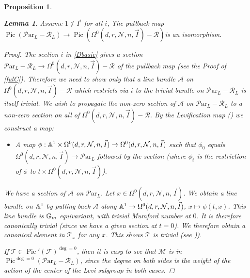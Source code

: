 \documentclass[11pt]{amsart}
\newcommand\mf{\mathcal{F}}
\newcommand\Pic{\operatorname{Pic}}
\newcommand\ma{\mathcal{A}}
\newcommand\mn{\mathcal{N}}
\newcommand\ParL{\mathcal{P}\text{ar}_L}
\newcommand\Par{\mathcal{P}\text{ar} }
\newtheorem{proposition}[theorem]{Proposition}
\newtheorem{lemma}[theorem]{Lemma}
\numberwithin{theorem}{subsection}
\begin{document}
{\begin{proposition}
\begin{lemma}\label{muchlater}
Assume $1\not\in I^i$ for all $i$,
The pullback map
$\Pic(\Par_L-\mathcal{R}_L)\to  \Pic({\Omega}^0(d,r,\mn,n,\vec{I})-\mathcal{R})$is an isomorphism.
\end{lemma}
\begin{proof}
The section $i$ in \eqref{Dbasic} gives a section $\ParL-\mathcal{R}_L\to {\Omega}^0(d,r,\mn,n,\vec{I})-\mathcal{R}$ of the pullback map (see the Proof of \eqref{fulC}). Therefore we need to show only that a line bundle $\ma$ on ${\Omega}^0(d,r,\mn,n,\vec{I})-\mathcal{R}$ which restricts via $i$ to the trivial bundle
on $\ParL-\mathcal{R}_L$ is itself trivial. We wish to propagate the non-zero section of $\ma$ on  $\ParL-\mathcal{R}_L$ to a non-zero section on all of ${\Omega}^0(d,r,\mn,n,\vec{I})-\mathcal{R}$.
By  the Levification map (\cite[Section 3.8]{BKq}) we construct a map:
\begin{itemize}
\item[-] A map $\phi:\Bbb{A}^1\times {\Omega}^0(d,r,\mn,n,\vec{I})\to \Omega^0(d,r,\mn,n,\vec{I})$ such that $\phi_0$ equals $\Omega^0(d,r,\mn,n,\vec{I})\to \ParL$ followed by the section (where $\phi_t$ is the restriction of $\phi$ to $t\times \Omega^0(d,r,\mn,n,\vec{I})$).
\end{itemize}

We have a section of $\mathcal{A}$ on $\ParL$. Let $x\in \Omega^0(d,r,\mn,n,\vec{I})$. We obtain a line bundle on $\Bbb{A}^1$ by pulling back  $\mathcal{A}$ along $\Bbb{A}^1\to \Omega^0(d,r,\mn,n,\vec{I})$, $x\mapsto \phi(t,x)$. This line bundle is $\Bbb{G}_m$ equivariant, with trivial Mumford number at $0$. It is therefore canonically trivial (since we have a given section at $t=0$). We therefore obtain a canonical element in $\mathcal{T}_x$ for any $x$. This shows $\mathcal{T}$ is trivial (see \cite[Lemma 8.6]{BHermit})).

If  $\mathcal{T}\in \Pic'(\mf)^{\deg=0}$, then it is easy to see that $\mathcal{M}$ is in $\Pic^{\deg=0}(\ParL -\mathcal{R}_L)$, since the degree on both sides is the weight of the action of the center of the Levi subgroup in both cases.
\end{proof}

\end{proposition}}
\end{document}
